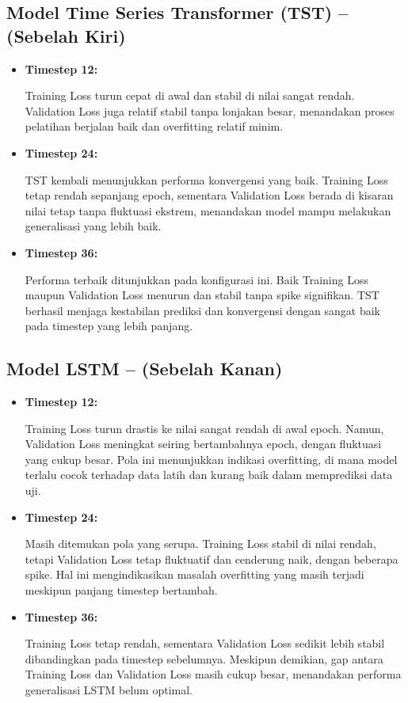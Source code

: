 \subsection{Model Time Series Transformer (TST) – (Sebelah Kiri)}
\begin{itemize}
    \item \textbf{Timestep 12:}
    
    Training Loss turun cepat di awal dan stabil di nilai sangat rendah. Validation Loss juga relatif stabil tanpa lonjakan besar, menandakan proses pelatihan berjalan baik dan overfitting relatif minim.
    
    \item \textbf{Timestep 24:}
    
    TST kembali menunjukkan performa konvergensi yang baik. Training Loss tetap rendah sepanjang epoch, sementara Validation Loss berada di kisaran nilai tetap tanpa fluktuasi ekstrem, menandakan model mampu melakukan generalisasi yang lebih baik.

    
    \item \textbf{Timestep 36:}

    Performa terbaik ditunjukkan pada konfigurasi ini. Baik Training Loss maupun Validation Loss menurun dan stabil tanpa spike signifikan. TST berhasil menjaga kestabilan prediksi dan konvergensi dengan sangat baik pada timestep yang lebih panjang.
\end{itemize}

\subsection{Model LSTM – (Sebelah Kanan)}
\begin{itemize}
    \item \textbf{Timestep 12:}
    
    Training Loss turun drastis ke nilai sangat rendah di awal epoch. Namun, Validation Loss meningkat seiring bertambahnya epoch, dengan fluktuasi yang cukup besar. Pola ini menunjukkan indikasi overfitting, di mana model terlalu cocok terhadap data latih dan kurang baik dalam memprediksi data uji.
    
    \item \textbf{Timestep 24:}
    
    Masih ditemukan pola yang serupa. Training Loss stabil di nilai rendah, tetapi Validation Loss tetap fluktuatif dan cenderung naik, dengan beberapa spike. Hal ini mengindikasikan masalah overfitting yang masih terjadi meskipun panjang timestep bertambah.

    
    \item \textbf{Timestep 36:}

    Training Loss tetap rendah, sementara Validation Loss sedikit lebih stabil dibandingkan pada timestep sebelumnya. Meskipun demikian, gap antara Training Loss dan Validation Loss masih cukup besar, menandakan performa generalisasi LSTM belum optimal.
\end{itemize}

